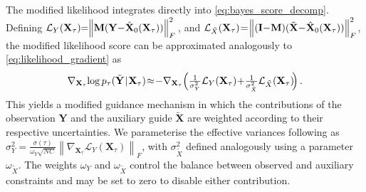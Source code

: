 \documentclass{article}
\begin{document}
The modified likelihood integrates directly into \eqref{eq:bayes_score_decomp}.
Defining 
$\mathcal{L}_Y(\mathbf{X}_\tau)\hspace{-3pt}=\hspace{-3pt}\left\| \mathbf{M}(\mathbf{Y} \hspace{-2pt}- \hspace{-2pt} \hat{\mathbf{X}}_0(\mathbf{X}_\tau)) \right\|_F^2\hspace{-2pt}$
, and
$\mathcal{L}_{\tilde{X}}(\mathbf{X}_\tau)\hspace{-2pt}=\hspace{-2pt}\left\| (\mathbf{I}\hspace{-2pt}-\hspace{-2pt}\mathbf{M})(\tilde{\mathbf{X}} \hspace{-2pt}- \hspace{-2pt}\hat{\mathbf{X}}_0(\mathbf{X}_\tau)) \right\|_F^2$,
the modified likelihood score can be approximated analogously to \eqref{eq:likelihood_gradient} as
\begin{equation}
\nabla_{\mathbf{X}_\tau}
\hspace{-2pt}
\log p_\tau(\tilde{\mathbf{Y}}
\hspace{-2pt}
\mid
\hspace{-2pt}
\mathbf{X}_\tau)
\hspace{-2pt}
\approx
\hspace{-2pt}
 -\nabla_{\mathbf{X}_\tau}
\hspace{-2pt}
\left(\tfrac{1}
    {\sigma_Y^2} 
    \mathcal{L}_Y(\mathbf{X}_\tau)
\hspace{-2pt}
+ 
\hspace{-2pt}
\tfrac{1}{\sigma_{\tilde{X}}^2}\mathcal{L}_{\tilde{X}}(\mathbf{X}_\tau)
\hspace{-2pt}
\right).
\label{eq:unified_gradient}
\end{equation}
This yields a modified guidance mechanism in which the contributions of the observation $\mathbf{Y}$ and the auxiliary guide $\tilde{\mathbf{X}}$ are weighted according to their respective uncertainties.
We parameterise the effective variances following \cite{moliner2023solving, shen2024understanding} as
$\sigma_Y^2 = \tfrac{\sigma(\tau)}{\omega_Y \sqrt{N C}} \left\| \nabla_{\mathbf{X}_\tau} \mathcal{L}_Y(\mathbf{X}_\tau) \right\|_F$,
with $\sigma_{\tilde{X}}^2$ defined analogously using a parameter $\omega_{\tilde{X}}$.
The weights $\omega_Y$ and $\omega_{\tilde{X}}$ control the balance between observed and auxiliary constraints and may be set to zero to disable either contribution.
\end{document}
